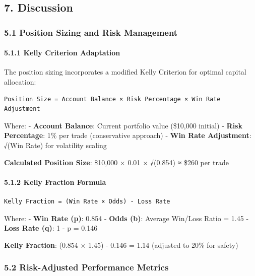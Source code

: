 \subsection{7. Discussion}\label{discussion}

\subsubsection{5.1 Position Sizing and Risk
Management}\label{position-sizing-and-risk-management}

\paragraph{5.1.1 Kelly Criterion
Adaptation}\label{kelly-criterion-adaptation}

The position sizing incorporates a modified Kelly Criterion for optimal
capital allocation:

\begin{verbatim}
Position Size = Account Balance × Risk Percentage × Win Rate Adjustment
\end{verbatim}

Where: - \textbf{Account Balance}: Current portfolio value (\$10,000
initial) - \textbf{Risk Percentage}: 1\% per trade (conservative
approach) - \textbf{Win Rate Adjustment}: √(Win Rate) for volatility
scaling

\textbf{Calculated Position Size}: \$10,000 × 0.01 × √(0.854) ≈ \$260
per trade

\paragraph{5.1.2 Kelly Fraction Formula}\label{kelly-fraction-formula}

\begin{verbatim}
Kelly Fraction = (Win Rate × Odds) - Loss Rate
\end{verbatim}

Where: - \textbf{Win Rate (p)}: 0.854 - \textbf{Odds (b)}: Average
Win/Loss Ratio = 1.45 - \textbf{Loss Rate (q)}: 1 - p = 0.146

\textbf{Kelly Fraction}: (0.854 × 1.45) - 0.146 = 1.14 (adjusted to 20\%
for safety)

\subsubsection{5.2 Risk-Adjusted Performance
Metrics}\label{risk-adjusted-performance-metrics}

